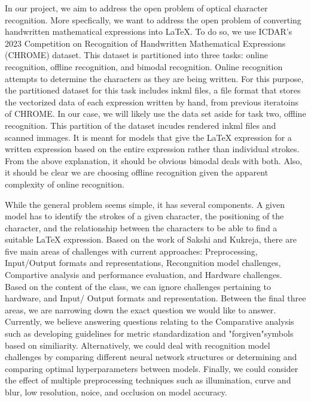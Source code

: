 \documentclass[../proposal.tex]{subfiles}
\begin{document}
\indent In our project, we aim to address the open problem of optical character recognition. More specfically, we want to address the open problem of converting handwritten mathematical expressions into LaTeX. To do so, we use ICDAR's 2023 Competition on Recognition of Handwritten Mathematical Expressions (CHROME) dataset. This dataset is partitioned into three tasks: online recognition, offline recognition, and bimodal recognition. Online recognition attempts to determine the characters as they are being written. For this purpose, the partitioned dataset for this task includes inkml files, a file format that stores the vectorized data of each expression written by hand, from previous iteratoins of CHROME\@. In our case, we will likely use the data set aside for task two, offline recognition. This partition of the dataset incudes rendered inkml files and scanned immages. It is meant for models that give the LaTeX expression for a written expression based on the entire expression rather than individual strokes. From the above explanation, it should be obvious bimodal deals with both. Also, it should be clear we are choosing offline recognition given the apparent complexity of online recognition. 

\indent While the general problem seems simple, it has several components. A given model has to identify the strokes of a given character, the positioning of the character, and the relationship between the characters to be able to find a suitable LaTeX expression. Based on the work of Sakshi and Kukreja, there are five main areas of challenges with current approaches: Preprocessing, Input/Output formats and representations, Recongnition model challenges, Compartive analysis and performance evaluation, and Hardware challenges. Based on the content of the class, we can ignore challenges pertaining to hardware, and Input/ Output formats and representation. Between the final three areas, we are narrowing down the exact question we would like to answer. Currently, we believe answering questions relating to the Comparative analysis such as developing guidelines for metric standardization and "forgiven"symbols based on similiarity. Alternatively, we could deal with recognition model challenges by comparing different neural network structures or determining and comparing optimal hyperparameters between models. Finally, we could consider the effect of multiple preprocessing techniques such as illumination, curve and blur, low resolution, noice, and occlusion on model accuracy. 
\end{document}
